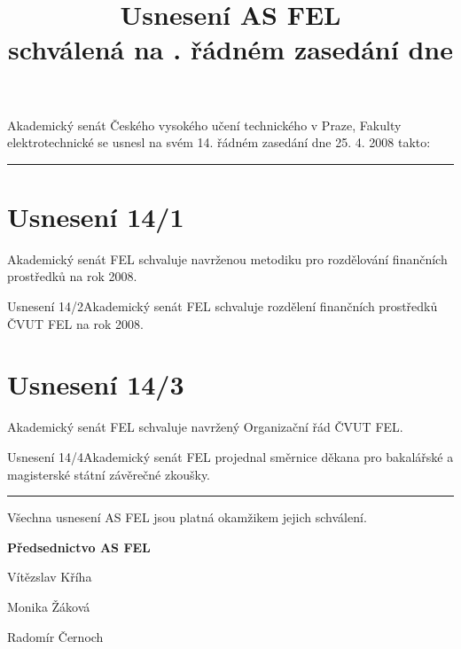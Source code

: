 \documentclass[a4paper,12pt,notitlepage]{article}
\title{Usnesení AS FEL\\schválená na \cislo. řádném zasedání dne \datum}
\author{}\date{}
\newcommand{\cislo}{14}
\newcommand{\datum}{25. 4. 2008 }
\newcommand{\hr}{\bigskip\hrule\bigskip}
\newcommand{\usneseni}[3]{
\section*{#1}

#2

}
\begin{document}
\maketitle
\thispagestyle{empty}


Akademický senát Českého vysokého učení technického v Praze, Fakulty
elektrotechnické se usnesl na svém \cislo. řádném zasedání dne \datum takto:\hr

\usneseni{Usnesení \cislo/1}{Akademický senát FEL schvaluje navrženou metodiku pro rozdělování finančních prostředků na rok 2008.}

\usneseni{Usnesení \cislo/2}{Akademický senát FEL schvaluje rozdělení finančních prostředků ČVUT FEL na rok 2008.}

\usneseni{Usnesení \cislo/3}{Akademický senát FEL schvaluje navržený Organizační řád ČVUT FEL.}

\usneseni{Usnesení \cislo/4}{Akademický senát FEL projednal směrnice děkana pro bakalářské a magisterské státní závěrečné zkoušky.}


\bigskip\hr
Všechna usnesení AS FEL jsou platná okamžikem jejich schválení.

\bigskip
\begin{center}
\textbf{Předsednictvo AS FEL}

Vítězslav Kříha

Monika Žáková

Radomír Černoch
\end{center}
\end{document}
